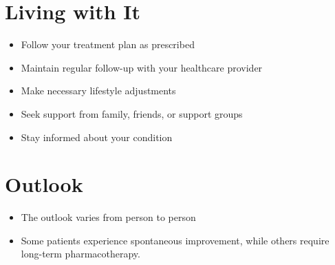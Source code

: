 \section{Living with It}
\begin{itemize}[noitemsep]
  \item Follow your treatment plan as prescribed
  \item Maintain regular follow-up with your healthcare provider
  \item Make necessary lifestyle adjustments
  \item Seek support from family, friends, or support groups
  \item Stay informed about your condition
\end{itemize}
\section{Outlook}
\begin{itemize}[noitemsep]
  \item The outlook varies from person to person
  \item Some patients experience spontaneous improvement, while others require long-term pharmacotherapy.
\end{itemize}
